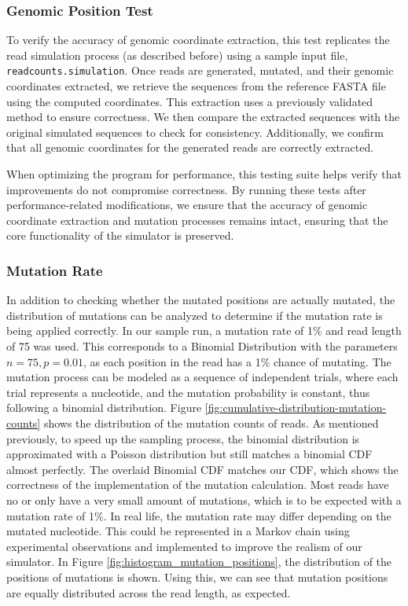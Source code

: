 \documentclass{article}
\begin{document}
    \subsubsection{Genomic Position Test}
    To verify the accuracy of genomic coordinate extraction, this test replicates the read simulation process (as described before) using a sample input file, \texttt{readcounts.simulation}. Once reads are generated, mutated, and their genomic coordinates extracted, we retrieve the sequences from the reference FASTA file using the computed coordinates. This extraction uses a previously validated method to ensure correctness. We then compare the extracted sequences with the original simulated sequences to check for consistency. Additionally, we confirm that all genomic coordinates for the generated reads are correctly extracted.

    When optimizing the program for performance, this testing suite helps verify that improvements do not compromise correctness. By running these tests after performance-related modifications, we ensure that the accuracy of genomic coordinate extraction and mutation processes remains intact, ensuring that the core functionality of the simulator is preserved.

    \subsubsection{Mutation Rate}

    In addition to checking whether the mutated positions are actually mutated, the distribution of mutations can be analyzed to determine if the mutation rate is being applied correctly. In our sample run, a mutation rate of 1\% and read length of 75 was used. This corresponds to a Binomial Distribution with the parameters \(n=75, p=0.01\), as each position in the read has a 1\% chance of mutating. The mutation process can be modeled as a sequence of independent trials, where each trial represents a nucleotide, and the mutation probability is constant, thus following a binomial distribution. Figure \ref{fig:cumulative-distribution-mutation-counts} shows the distribution of the mutation counts of reads. As mentioned previously, to speed up the sampling process, the binomial distribution is approximated with a Poisson distribution but still matches a binomial CDF almost perfectly. The overlaid Binomial CDF matches our CDF, which shows the correctness of the implementation of the mutation calculation. Most reads have no or only have a very small amount of mutations, which is to be expected with a mutation rate of 1\%. In real life, the mutation rate may differ depending on the mutated nucleotide. This could be represented in a Markov chain using experimental observations and implemented to improve the realism of our simulator.
    In Figure \ref{fig:histogram_mutation_positions}, the distribution of the positions of mutations is shown. Using this, we can see that mutation positions are equally distributed across the read length, as expected.
\end{document}

